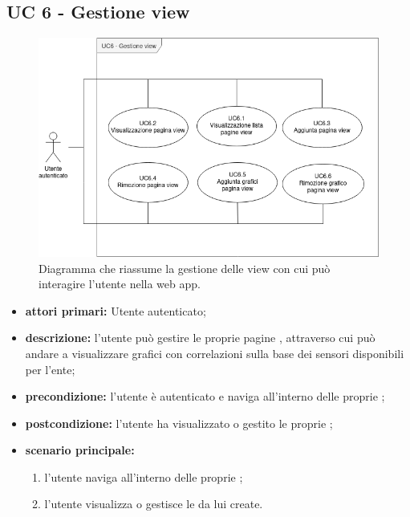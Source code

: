 	\subsection{UC 6 - Gestione view}

		\begin{figure}[H]
			\centering
			\includegraphics[scale=0.60]{res/images/uc6}
			\caption{Diagramma che riassume la gestione delle view con cui può interagire l'utente nella web app.}
		\end{figure}

		\begin{itemize}
			\item \textbf{attori primari:} Utente autenticato;
			\item \textbf{descrizione:} l'utente può gestire le proprie pagine , attraverso cui può andare a visualizzare grafici con correlazioni sulla base dei sensori disponibili per l'ente;
			\item \textbf{precondizione:} l'utente è autenticato e naviga all'interno delle proprie ;
			\item \textbf{postcondizione:} l'utente ha visualizzato o gestito le proprie ;
			\item \textbf{scenario principale:}
			\begin{enumerate}
				\item{l'utente naviga all'interno delle proprie ;}
				\item{l'utente visualizza o gestisce le  da lui create.}
			\end{enumerate}	
		\end{itemize}


